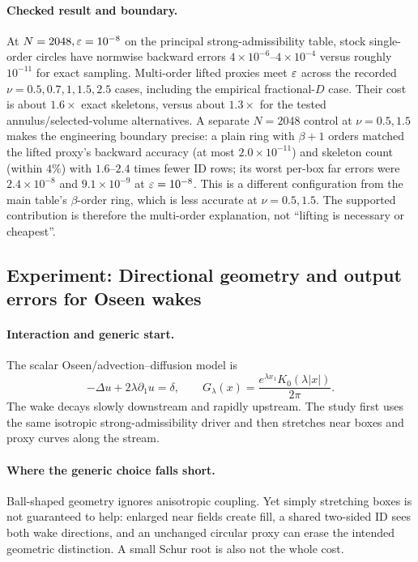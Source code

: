\paragraph{Checked result and boundary.} At $N=2048,\varepsilon=10^{-8}$ on the principal strong-admissibility table, stock single-order circles have normwise backward errors $4\times10^{-6}$--$4\times10^{-4}$ versus roughly $10^{-11}$ for exact sampling. Multi-order lifted proxies meet $\varepsilon$ across the recorded $\nu=0.5,0.7,1,1.5,2.5$ cases, including the empirical fractional-$D$ case. Their cost is about $1.6\times$ exact skeletons, versus about $1.3\times$ for the tested annulus/selected-volume alternatives. A separate $N=2048$ control at $\nu=0.5,1.5$ makes the engineering boundary precise: a plain ring with $\beta+1$ orders matched the lifted proxy's backward accuracy (at most $2.0\times10^{-11}$) and skeleton count (within $4\%$) with $1.6$--$2.4$ times fewer ID rows; its worst per-box far errors were $2.4\times10^{-8}$ and $9.1\times10^{-9}$ at $\varepsilon=10^{-8}$. This is a different configuration from the main table's $\beta$-order ring, which is less accurate at $\nu=0.5,1.5$. The supported contribution is therefore the multi-order explanation, not ``lifting is necessary or cheapest''.

\subsection{Experiment: Directional geometry and output errors for Oseen wakes}
\label{exp:e12}
\paragraph{Interaction and generic start.} The scalar Oseen/advection--diffusion model is
\[
 -\Delta u+2\lambda\partial_1u=\delta,\qquad
 G_\lambda(x)=\frac{e^{\lambda x_1}K_0(\lambda|x|)}{2\pi}.
\]
The wake decays slowly downstream and rapidly upstream. The study first uses the same isotropic strong-admissibility driver and then stretches near boxes and proxy curves along the stream.

\paragraph{Where the generic choice falls short.} Ball-shaped geometry ignores anisotropic coupling. Yet simply stretching boxes is not guaranteed to help: enlarged near fields create fill, a shared two-sided ID sees both wake directions, and an unchanged circular proxy can erase the intended geometric distinction. A small Schur root is also not the whole cost.

